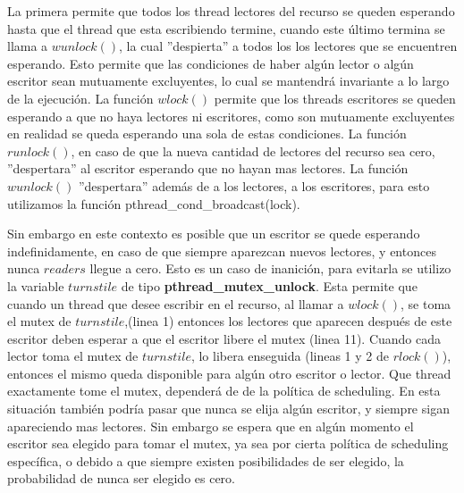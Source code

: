 La primera permite que todos los thread lectores del recurso se queden esperando hasta que el thread que esta escribiendo termine, cuando este último termina se llama a $ wunlock() $, la cual ''despierta'' a todos los los lectores que se encuentren esperando. Esto permite que las condiciones de haber algún lector o algún escritor sean mutuamente excluyentes, lo cual se mantendrá invariante a lo largo de la ejecución. La función $ wlock() $ permite que los threads escritores se queden esperando a que no haya lectores ni escritores, como son mutuamente excluyentes en realidad se queda esperando una sola de estas condiciones. La función $ runlock() $, en caso de que la nueva cantidad de lectores del recurso sea cero, ''despertara'' al escritor esperando que no hayan mas lectores. La función $ wunlock() $ ''despertara'' además de a los lectores, a los escritores, para esto utilizamos la función pthread_cond_broadcast(lock).

Sin embargo en este contexto es posible que un escritor se quede esperando indefinidamente, en caso de que siempre aparezcan nuevos lectores, y entonces nunca $ readers $ llegue a cero. Esto es un caso de inanición, para evitarla se utilizo la variable $ turnstile $ de tipo \textbf{pthread_mutex_unlock}. Esta permite que cuando un thread que desee escribir en el recurso, al llamar a $ wlock() $, se toma el mutex de $ turnstile $,(linea 1) entonces los lectores que aparecen después de este escritor deben esperar a que el escritor libere el mutex (linea 11). Cuando cada lector toma el mutex de $ turnstile $, lo libera enseguida (lineas 1 y 2 de $ rlock() $), entonces el mismo queda disponible para algún otro escritor o lector. Que thread exactamente tome el mutex, dependerá de de la política de scheduling. En esta situación también podría pasar que nunca se elija algún escritor, y siempre sigan apareciendo mas lectores. Sin embargo se espera que en algún momento el escritor sea elegido para tomar el mutex, ya sea por cierta política de scheduling específica, o debido a que siempre existen posibilidades de ser elegido, la probabilidad de nunca ser elegido es cero.
